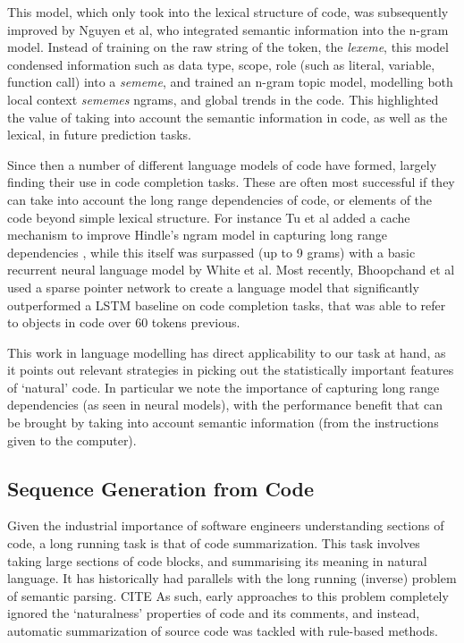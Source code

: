 This model, which only took into the lexical structure of code, was subsequently improved by Nguyen et al\cite{nguyen_statistical_2013}, who integrated semantic information into the n-gram model.
Instead of training on the raw string of the token, the \textit{lexeme}, this model condensed information such as data type, scope, role (such as literal, variable, function call) into a \textit{sememe}, and trained an n-gram topic model, modelling both local context \textit{sememes} ngrams, and global trends in the code.
This highlighted the value of taking into account the semantic information in code, as well as the lexical, in future prediction tasks.

Since then a number of different language models of code have formed, largely finding their use in code completion tasks. These are often most successful if they can take into account the long range dependencies of code, or elements of the code beyond simple lexical structure. For instance Tu et al added a cache mechanism to improve Hindle's ngram model in capturing long range dependencies  \cite{tu_localness_nodate}, while this itself was surpassed (up to 9 grams) with a basic recurrent neural language model by White et al\cite{white_toward_2015}.
Most recently, Bhoopchand et al used a sparse pointer network to create a language model that significantly outperformed a LSTM baseline on code completion tasks, that was able to refer to objects in code over 60 tokens previous\cite{bhoopchand_learning_2016}.

This work in language modelling has direct applicability to our task at hand, as it points out relevant strategies in picking out the statistically important features of `natural' code. In particular we note the importance of capturing long range dependencies (as seen in neural models), with the performance benefit that can be brought by taking into account semantic information (from the instructions given to the computer).

\subsection{Sequence Generation from Code}

Given the industrial importance of software engineers understanding sections of code, a long running task is that of code summarization. 
This task involves taking large sections of code blocks, and summarising its meaning in natural language. It has historically had parallels with the long running (inverse) problem of semantic parsing. CITE
As such, early approaches to this problem completely ignored the `naturalness' properties of code and its comments, and instead, automatic summarization of source code was tackled with rule-based methods. 

